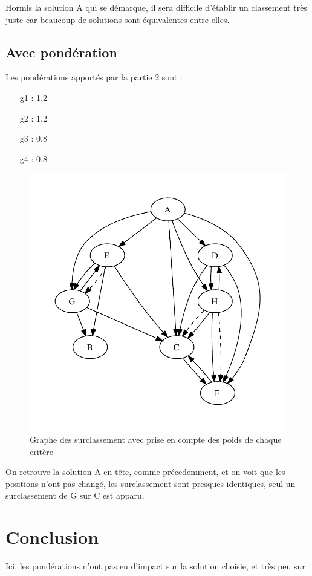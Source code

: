 Hormis la solution A qui se démarque, il sera difficile d'établir un classement très juste car beaucoup de solutions sont équivalentes entre elles.

\subsection{Avec pondération}

Les pondérations apportés par la partie 2 sont :
\begin{itemize}
\item[g1] : 1.2
\item[g2] : 1.2
\item[g3] : 0.8
\item[g4] : 0.8
\end{itemize}

\begin{figure}[!ht]
\includegraphics{../SourcesMatlab/electre3-2.pdf}
\caption{Graphe des surclassement avec prise en compte des poids de chaque critère}
\end{figure}

On retrouve la solution A en tête, comme précedemment, et on voit que les positions n'ont pas changé, les surclassement sont presques identiques, seul un surclassement de G sur C est apparu.

\section{Conclusion}

Ici, les pondérations n'ont pas eu d'impact sur la solution choisie, et très peu sur 
